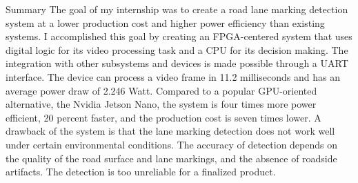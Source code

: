 \documentclass{matthijs}
\begin{document}
\begin{hoofdstuk*}{Summary}
		The goal of my internship was to create a road lane marking detection system at a lower production cost and higher power efficiency than existing systems.
		I accomplished this goal by creating an FPGA-centered system that uses digital logic for its video processing task and a CPU for its decision making.
		The integration with other subsystems and devices is made possible through a UART interface.
		The device can process a video frame in 11.2 milliseconds and has an average power draw of 2.246 Watt.
		Compared to a popular GPU-oriented alternative, the Nvidia Jetson Nano, the system is four times more power efficient, 20 percent faster, and the production cost is seven times lower.
		A drawback of the system is that the lane marking detection does not work well under certain environmental conditions.
		The accuracy of detection depends on the quality of the road surface and lane markings, and the absence of roadside artifacts.
		The detection is too unreliable for a finalized product.

	\end{hoofdstuk*}

	\begin{inhoudspagina}

	\end{inhoudspagina}

\end{document}

